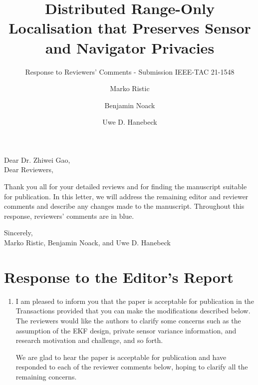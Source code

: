\documentclass[a4paper]{scrartcl}
\title{\boldmath Distributed Range-Only Localisation that Preserves Sensor and Navigator Privacies}
\subtitle{Response to Reviewers' Comments - Submission IEEE-TAC 21-1548}
\author{Marko Ristic\and Benjamin Noack\and Uwe D. Hanebeck}
\newenvironment{rebuttal}{\begin{enumerate}[label={\color{grey}\thesection.\arabic{enumi}},leftmargin=0pt,ref=\thesection.\arabic{enumi}]}{\end{enumerate}}
\newcommand{\reviewtext}[1]{{\color{nblue} #1}}
\begin{document}
\maketitle

Dear Dr. Zhiwei Gao,\\
Dear Reviewers,

Thank you all for your detailed reviews and for finding the manuscript suitable for publication. In this letter, we will address the remaining editor and reviewer comments and describe any changes made to the manuscript. Throughout this response, reviewers' comments are in \reviewtext{blue}. 

Sincerely,\\
Marko Ristic, Benjamin Noack, and Uwe D. Hanebeck




\section*{Response to the Editor's Report}
\def\thesection{E}
\begin{rebuttal} %
\item \reviewtext{I am pleased to inform you that the paper is acceptable for publication in the Transactions provided that you can make the modifications described below. The reviewers would like the authors to clarify some concerns such as the assumption of the EKF design, private sensor variance information, and research motivation and challenge, and so forth.}

We are glad to hear the paper is acceptable for publication and have responded to each of the reviewer comments below, hoping to clarify all the remaining concerns.

\end{rebuttal}

\end{document}
